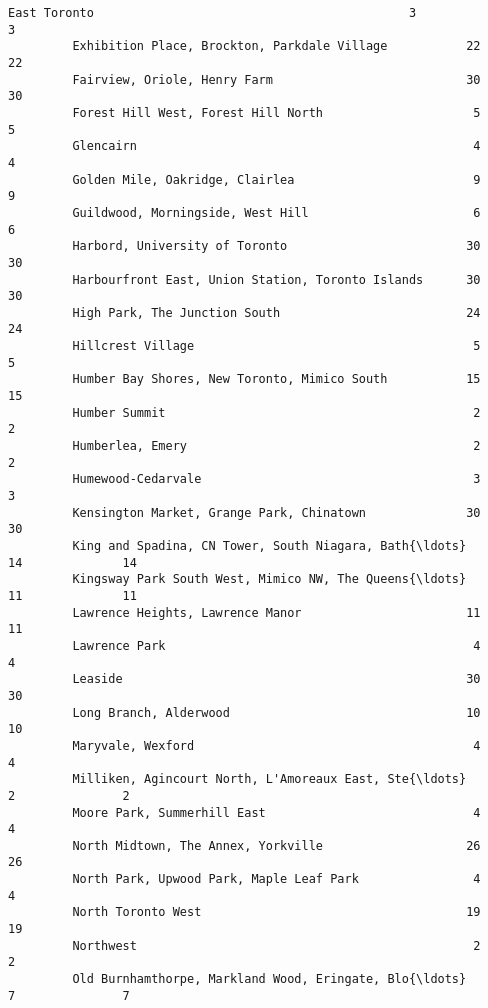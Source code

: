 \documentclass[11pt]{article}
\begin{document}
\begin{Verbatim}[commandchars=\\\{\}]
         East Toronto                                            3               3   
         Exhibition Place, Brockton, Parkdale Village           22              22   
         Fairview, Oriole, Henry Farm                           30              30   
         Forest Hill West, Forest Hill North                     5               5   
         Glencairn                                               4               4   
         Golden Mile, Oakridge, Clairlea                         9               9   
         Guildwood, Morningside, West Hill                       6               6   
         Harbord, University of Toronto                         30              30   
         Harbourfront East, Union Station, Toronto Islands      30              30   
         High Park, The Junction South                          24              24   
         Hillcrest Village                                       5               5   
         Humber Bay Shores, New Toronto, Mimico South           15              15   
         Humber Summit                                           2               2   
         Humberlea, Emery                                        2               2   
         Humewood-Cedarvale                                      3               3   
         Kensington Market, Grange Park, Chinatown              30              30   
         King and Spadina, CN Tower, South Niagara, Bath{\ldots}     14              14   
         Kingsway Park South West, Mimico NW, The Queens{\ldots}     11              11   
         Lawrence Heights, Lawrence Manor                       11              11   
         Lawrence Park                                           4               4   
         Leaside                                                30              30   
         Long Branch, Alderwood                                 10              10   
         Maryvale, Wexford                                       4               4   
         Milliken, Agincourt North, L'Amoreaux East, Ste{\ldots}      2               2   
         Moore Park, Summerhill East                             4               4   
         North Midtown, The Annex, Yorkville                    26              26   
         North Park, Upwood Park, Maple Leaf Park                4               4   
         North Toronto West                                     19              19   
         Northwest                                               2               2   
         Old Burnhamthorpe, Markland Wood, Eringate, Blo{\ldots}      7               7   

\end{Verbatim}
\end{document}
